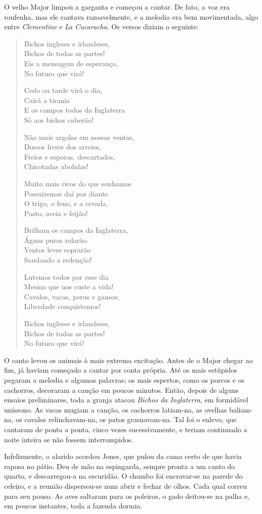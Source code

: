 O velho Major limpou a garganta e começou a cantar. De fato, a voz era roufenha, mas ele cantava razoavelmente, e a melodia era bem movimentada, algo entre \textit{Clementine} e \textit{La Cucaracha}. Os versos diziam o seguinte:

\begin{verse}
Bichos ingleses e irlandeses, \\
Bichos de todas as partes! \\
Eis a mensagem de esperança, \\
No futuro que virá!

Cedo ou tarde virá o dia, \\
Cairá a tirania \\
E os campos todos da Inglaterra \\
Só aos bichos caberão!

Não mais argolas em nossas ventas, \\
Dorsos livres dos arreios, \\
Freios e esporas, descartados, \\
Chicotadas abolidas!

Muito mais ricos do que sonhamos \\
Possuiremos daí por diante \\
O trigo, o feno, e a cevada, \\
Pasto, aveia e feijão!

Brilham os campos da Inglaterra, \\
Águas puras rolarão. \\
Ventos leves soprarão \\
Saudando a redenção!

Lutemos todos por esse dia \\
Mesmo que nos custe a vida! \\
Cavalos, vacas, perus e gansos, \\
Liberdade conquistemos!

Bichos ingleses e irlandeses, \\
Bichos de todas as partes! \\
No futuro que virá!
\end{verse}

O canto levou os animais à mais extrema excitação. Antes de o Major chegar ao fim, já haviam começado a cantar por conta própria. Até os mais estúpidos pegaram a melodia e algumas palavras; os mais espertos, como os porcos e os cachorros, decoraram a canção em poucos minutos. Então, depois de alguns ensaios preliminares, toda a granja atacou \textit{Bichos da Inglaterra}, em formidável uníssono. As vacas mugiam a canção, os cachorros latiam-na, as ovelhas baliam-na, os cavalos relinchavam-na, os patos grasnavam-na. Tal foi o enlevo, que cantaram de ponta a ponta, cinco vezes sucessivamente, e teriam continuado a noite inteira se não fossem interrompidos.

Infelizmente, o alarido acordou Jones, que pulou da cama certo de que havia raposa no pátio. Deu de mão na espingarda, sempre pronta a um canto do quarto, e descarregou-a na escuridão. O chumbo foi encravar-se na parede do celeiro, e a reunião dispersou-se num abrir e fechar de olhos. Cada qual correu para seu pouso. As aves saltaram para os poleiros, o gado deitou-se na palha e, em poucos instantes, toda a fazenda dormia.
